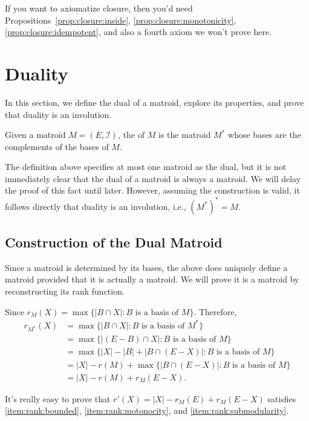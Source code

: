 If you want to axiomatize closure, then you'd need Propositions~\ref{prop:closure:inside}, \ref{prop:closure:monotonicity}, \ref{prop:closure:idempotent}, and also a fourth axiom we won't prove here.

\section{Duality}

In this section, we define the dual of a matroid, explore its properties, and prove that duality is an involution.

\begin{definition}[Dual]
    Given a matroid \(M = (E, \mathcal{I})\),
    the  of \(M\) is the matroid \(M^*\)
    whose bases are the complements of the bases of \(M\).
\end{definition}

The definition above specifies at most one matroid as the dual, but it is not immediately clear that the dual of a matroid is always a matroid. We will delay the proof of this fact until later. However, assuming the construction is valid, it follows directly that duality is an involution, i.e., \((M^*)^* = M\).

\subsection{Construction of the Dual Matroid}

Since a matroid is determined by its bases,
the above does uniquely define a matroid provided that it is actually a matroid.
We will prove it is a matroid by reconstructing its rank function.

Since \(r_M(X) = \max\{ |B \cap X| : B \text{ is a basis of } M\}\).
Therefore,
\begin{align*}
    r_{M^*}(X)
    &= \max\{ |B \cap X| : B \text{ is a basis of } M^*\} \\
    &= \max\{ |(E - B) \cap X| : B \text{ is a basis of } M\} \\
    &= \max\{ |X| - |B| + |B \cap (E - X)| : B \text{ is a basis of } M\} \\
    &= |X| - r(M) + \max\{ |B \cap (E - X)| : B \text{ is a basis of } M\} \\
    &= |X| - r(M) + r_M(E - X).
\end{align*}

It's really easy to prove that \(r'(X) = |X| - r_M(E) + r_M(E - X)\) satisfies \ref{item:rank:bounded}, \ref{item:rank:motonocity}, and \ref{item:rank:submodularity}.

